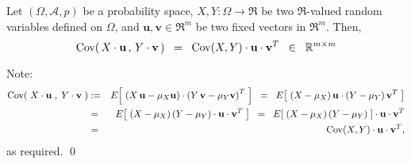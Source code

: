 \documentclass{article}
\begin{document}
\begin{lemma}
\label{lemma:technical}
\mbox{}
\vskip 0.1cm
\noindent
Let $(\Omega,\mathcal{A},p)$ be a probability space,
$X, Y : \Omega \longrightarrow \Re$ be two $\Re$-valued random variables defined on $\Omega$,
and $\mathbf{u}, \mathbf{v} \in \Re^{m}$ be two fixed vectors in $\Re^{m}$.
Then,
\begin{equation*}
\textnormal{Cov}\!\left(\,X\cdot\mathbf{u}\,,\,Y\cdot\mathbf{v}\,\right)
\;\;=\;\;
\textnormal{Cov}(X,Y)\cdot\mathbf{u}\cdot\mathbf{v}^{T}
\;\;\in\;\; \mathbb{R}^{m \times m}
\end{equation*}
\end{lemma}

\proof
Note:
\begin{eqnarray*}
\textnormal{Cov}\!\left(\;X\cdot\mathbf{u}\;,\;Y\cdot\mathbf{v}\;\right)
&:=& E\!\left[\;\left(X\,\mathbf{u} - \mu_{X}\mathbf{u}\right)\cdot\left(Y\,\mathbf{v} - \mu_{Y}\mathbf{v}\right)^{T}\;\right]
\;\;=\;\; E\!\left[\;\left(X - \mu_{X}\right)\mathbf{u}\cdot\left(Y - \mu_{Y}\right)\mathbf{v}^{T}\;\right] \\
&=& E\!\left[\;\left(X - \mu_{X}\right)\left(Y - \mu_{Y}\right)\cdot\mathbf{u}\cdot\mathbf{v}^{T}\;\right] 
\;\;=\;\; E\!\left[\;\left(X - \mu_{X}\right)\left(Y - \mu_{Y}\right)\;\right]\cdot\mathbf{u}\cdot\mathbf{v}^{T} \\
&=& \textnormal{Cov}(X,Y)\cdot\mathbf{u}\cdot\mathbf{v}^{T},
\end{eqnarray*}
as required.
\qed
\end{document}
